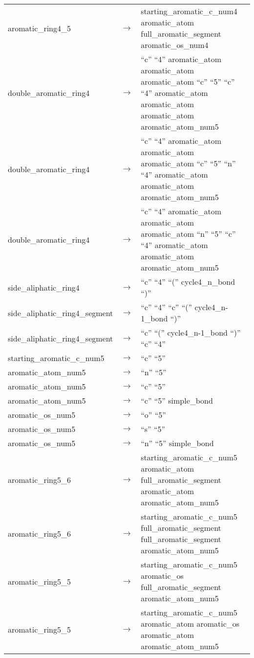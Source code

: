 \begin{longtable}{m{} p{} p{}}
    aromatic\_ring4\_5 & $\rightarrow$ & starting\_aromatic\_c\_num4 aromatic\_atom full\_aromatic\_segment aromatic\_os\_num4 \\
    double\_aromatic\_ring4 & $\rightarrow$ & ``c'' ``4'' aromatic\_atom aromatic\_atom aromatic\_atom ``c'' ``5'' ``c'' ``4'' aromatic\_atom aromatic\_atom aromatic\_atom aromatic\_atom\_num5 \\
    double\_aromatic\_ring4 & $\rightarrow$ & ``c'' ``4'' aromatic\_atom aromatic\_atom aromatic\_atom ``c'' ``5'' ``n'' ``4'' aromatic\_atom aromatic\_atom aromatic\_atom\_num5 \\
    double\_aromatic\_ring4 & $\rightarrow$ & ``c'' ``4'' aromatic\_atom aromatic\_atom aromatic\_atom ``n'' ``5'' ``c'' ``4'' aromatic\_atom aromatic\_atom aromatic\_atom\_num5 \\
    side\_aliphatic\_ring4 & $\rightarrow$ & ``c'' ``4'' ``('' cycle4\_n\_bond ``)'' \\
    side\_aliphatic\_ring4\_segment & $\rightarrow$ & ``c'' ``4'' ``c'' ``('' cycle4\_n-1\_bond ``)'' \\
    side\_aliphatic\_ring4\_segment & $\rightarrow$ & ``c'' ``('' cycle4\_n-1\_bond ``)'' ``c'' ``4'' \\
    starting\_aromatic\_c\_num5 & $\rightarrow$ & ``c'' ``5'' \\
    aromatic\_atom\_num5 & $\rightarrow$ & ``n'' ``5'' \\
    aromatic\_atom\_num5 & $\rightarrow$ & ``c'' ``5'' \\
    aromatic\_atom\_num5 & $\rightarrow$ & ``c'' ``5'' simple\_bond \\
    aromatic\_os\_num5 & $\rightarrow$ & ``o'' ``5'' \\
    aromatic\_os\_num5 & $\rightarrow$ & ``s'' ``5'' \\
    aromatic\_os\_num5 & $\rightarrow$ & ``n'' ``5'' simple\_bond \\
    aromatic\_ring5\_6 & $\rightarrow$ & starting\_aromatic\_c\_num5 aromatic\_atom full\_aromatic\_segment aromatic\_atom aromatic\_atom\_num5 \\
    aromatic\_ring5\_6 & $\rightarrow$ & starting\_aromatic\_c\_num5 full\_aromatic\_segment full\_aromatic\_segment aromatic\_atom\_num5 \\
    aromatic\_ring5\_5 & $\rightarrow$ & starting\_aromatic\_c\_num5 aromatic\_os full\_aromatic\_segment aromatic\_atom\_num5 \\
    aromatic\_ring5\_5 & $\rightarrow$ & starting\_aromatic\_c\_num5 aromatic\_atom aromatic\_os aromatic\_atom aromatic\_atom\_num5 \\

\end{longtable}
